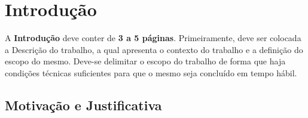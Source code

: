 \chapter{Introdução}
\label{sec-intro}



A \textbf{Introdução} deve conter de \textbf{3 a 5 páginas}. Primeiramente, deve ser colocada a
Descrição do trabalho, a qual apresenta o contexto do trabalho e a definição do escopo do
mesmo. Deve-se delimitar o escopo do trabalho de forma que haja condições
técnicas suficientes para que o mesmo seja concluído em tempo hábil.

\section{Motivação e Justificativa}
\label{sec-intro-motjus}


